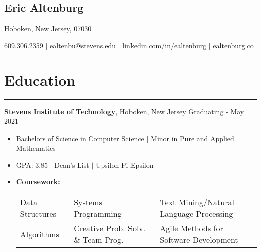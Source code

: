 \documentclass[10pt]{article}
\newcommand{\name}[1]{\begin{center}\section*{\huge #1}\end{center}}
\newcommand{\topinfo}[1]{\begin{center}\vspace{-0.15cm}#1\vspace{-0.15cm}\end{center}}
\newcommand{\resumesection}[1]{\vspace{-0.2cm}\section*{#1}\vspace{-0.2cm}\hrule\vspace{0.2cm}}
\begin{document}
\name{Eric Altenburg}
\topinfo{Hoboken, New Jersey, 07030}

\topinfo{609.306.2359 $\vert$ ealtenbu@stevens.edu $\vert$ linkedin.com/in/ealtenburg $\vert$ ealtenburg.co}








\resumesection{Education}
\textbf{Stevens Institute of Technology}, Hoboken, New Jersey \hfill Graduating - May 2021
\begin{itemize}
	\item[] Bachelors of Science in Computer Science $\vert$ Minor in Pure and Applied Mathematics
	\item[] GPA: 3.85 $\vert$ Dean's List $\vert$ Upsilon Pi Epsilon 
	\item[] \textbf{Coursework:}
	\setlength\tabcolsep{6 pt}
			\begin{tabular}[t]{l l l}
				Data Structures & Systems Programming & Text Mining/Natural Language Processing\\ %
				Algorithms & Creative Prob. Solv. \& Team Prog. & Agile Methods for Software Development
			\end{tabular}

\end{itemize}
\end{document}
